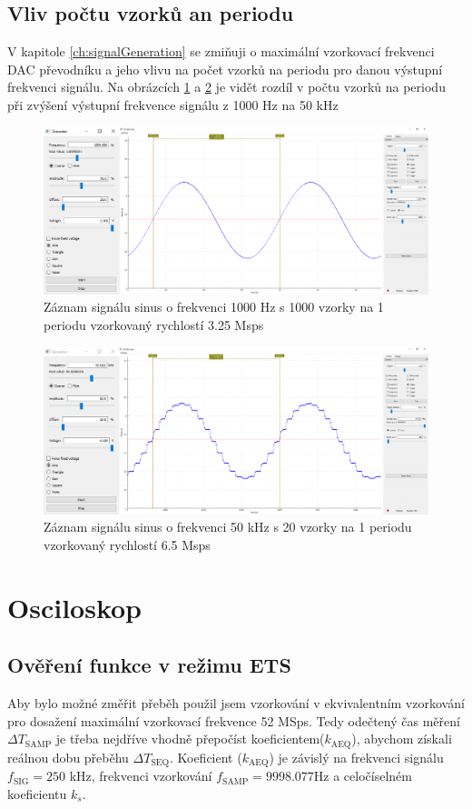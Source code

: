 \subsection{Vliv počtu vzorků an periodu}
V kapitole \ref{ch:signalGeneration} se zmiňuji o maximální vzorkovací frekvenci DAC převodníku a jeho vlivu na počet vzorků na periodu pro danou výstupní frekvenci signálu. Na obrázcích \ref{fig:sinus1000hz} a \ref{fig:sinus50khz} je vidět rozdíl v počtu vzorků na periodu při zvýšení výstupní frekvence signálu z 1000 Hz na 50 kHz
\begin{figure}[H]
	\centering
	\includegraphics[width=0.9\linewidth]{Figs/Screenshots/Sinus1000Hz}
	\caption{Záznam signálu sinus o frekvenci 1000 Hz s 1000 vzorky na 1 periodu vzorkovaný rychlostí 3.25 Msps}
	\label{fig:sinus1000hz}
\end{figure}
\begin{figure}[H]
	\centering
	\includegraphics[width=0.9\linewidth]{Figs/Screenshots/Sine50K.pdf}
	\caption{Záznam signálu sinus o frekvenci 50 kHz s 20 vzorky na 1 periodu vzorkovaný rychlostí 6.5 Msps}
	\label{fig:sinus50khz}
\end{figure}

\section{Osciloskop}
\subsection{Ověření funkce v režimu ETS}
Aby bylo možné změřit přeběh použil jsem vzorkování v ekvivalentním vzorkování pro dosažení maximální vzorkovací frekvence 52 MSps. Tedy odečtený čas měření $\Delta T_{\text{SAMP}}$ je třeba nejdříve vhodně přepočíst koeficientem($k_{\text{AEQ}}$), abychom získali reálnou dobu přeběhu $\Delta T_{\text{SEQ}}$. Koeficient ($k_{\text{AEQ}}$) je závislý na frekvenci signálu $f_{\text{SIG}}=250$ kHz, frekvenci vzorkování $f_{\text{SAMP}}=9998.077$Hz a celočíselném koeficientu $k_s$.

